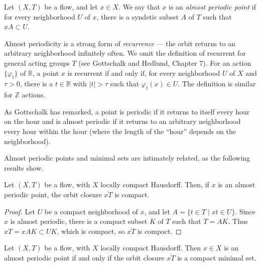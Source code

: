 Let $(X,T)$ be a flow, and let $x \in X$. We say that $x$ is an \emph{almost periodic point} if for every neighborhood $U$ of $x$, there is a syndetic subset $A$ of $T$ such that $xA \subset U$.



Almost periodicity is a strong form of \emph{recurrence} — the orbit returns to an arbitrary neighborhood infinitely often. We omit the definition of recurrent for general acting groups $T$ (see Gottschalk and Hedlund, Chapter 7). For an action $\{\varphi_t\}$ of $\mathbb{R}$, a point $x$ is recurrent if and only if, for every neighborhood $U$ of $X$ and $\tau > 0$, there is a $t \in \mathbb{R}$ with $|t| > \tau$ such that $\varphi_t(x) \in U$. The definition is similar for $\mathbb{Z}$ actions.

As Gottschalk has remarked, a point is periodic if it returns to itself every hour on the hour and is almost periodic if it returns to an arbitrary neighborhood every hour within the hour (where the length of the “hour” depends on the neighborhood).


Almost periodic points and minimal sets are intimately related, as the following results show.


\begin{lemma*}[6]
    Let $(X,T)$ be a flow, with $X$ locally compact Hausdorff. Then, if $x$ is an almost periodic point, the orbit closure $\overline{xT}$ is compact.
\end{lemma*}

\begin{proof}
    Let $U$ be a compact neighborhood of $x$, and let $A = \{t \in T \mid xt \in U\}$. Since $x$ is almost periodic, there is a compact subset $K$ of $T$ such that $T = AK$. Thus $xT = xAK \subset UK$, which is compact, so $\overline{xT}$ is compact.
\end{proof}


\begin{theorem*}[7]
    Let $(X,T)$ be a flow, with $X$ locally compact Hausdorff. Then $x \in X$ is an almost periodic point if and only if the orbit closure $\overline{xT}$ is a compact minimal set.
\end{theorem*}

